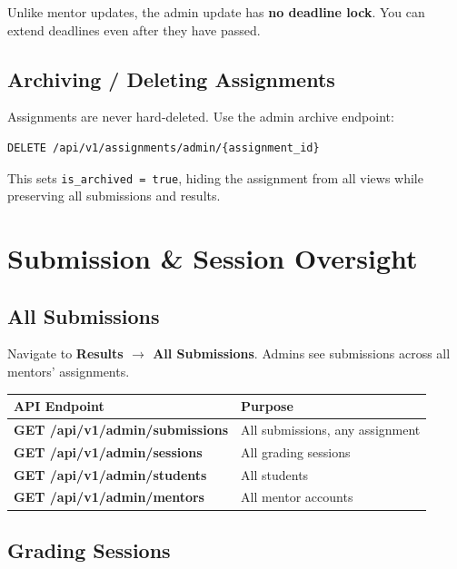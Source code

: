 \documentclass[12pt,a4paper]{article}
\begin{document}
\begin{tipbox}
  Unlike mentor updates, the admin update has \textbf{no deadline lock}. You can extend deadlines even after they have passed.
\end{tipbox}

\subsection{Archiving / Deleting Assignments}

Assignments are never hard-deleted. Use the admin archive endpoint:

\begin{lstlisting}
DELETE /api/v1/assignments/admin/{assignment_id}
\end{lstlisting}

This sets \texttt{is\_archived = true}, hiding the assignment from all views while preserving all submissions and results.

\section{Submission \& Session Oversight}

\subsection{All Submissions}

Navigate to \textbf{Results $\rightarrow$ All Submissions}. Admins see submissions across all mentors' assignments.

\begin{center}
\begin{tabularx}{\linewidth}{>{\bfseries}lX}
\toprule
API Endpoint & Purpose \\
\midrule
GET /api/v1/admin/submissions & All submissions, any assignment \\
GET /api/v1/admin/sessions    & All grading sessions \\
GET /api/v1/admin/students    & All students \\
GET /api/v1/admin/mentors     & All mentor accounts \\
\bottomrule
\end{tabularx}
\end{center}

\subsection{Grading Sessions}
\end{document}
